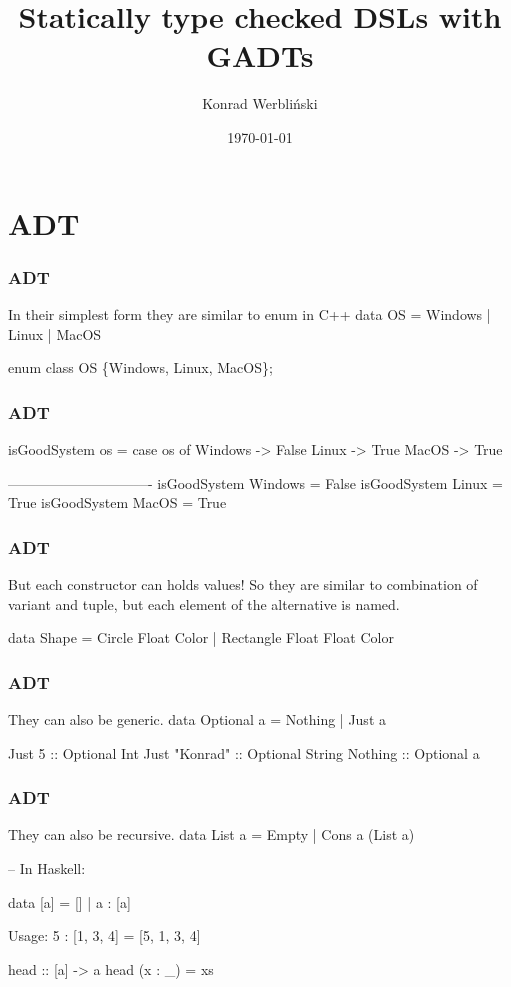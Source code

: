 \documentclass{beamer}
\title[GADT]{Statically type checked DSLs with GADTs} %
\author{Konrad Werbliński} %
\institute[UWr] %
\date{\today} %
\newenvironment{VerbExample}
{\example\semiverbatim}
{\endsemiverbatim\endexample}
\begin{document}
\begin{frame}
\titlepage %
\end{frame}

\section{ADT}

\begin{frame}[fragile]
  \frametitle{ADT}
  In their simplest form they are similar to enum in C++
  \begin{VerbExample}
data OS = Windows | Linux | MacOS

enum class OS \{Windows, Linux, MacOS\};
  \end{VerbExample}
\end{frame}


\begin{frame}[fragile]
  \frametitle{ADT}
  \begin{VerbExample}
isGoodSystem os = case os of
  Windows -> False
  Linux -> True
  MacOS -> True

-------------------------------
isGoodSystem Windows = False
isGoodSystem Linux = True
isGoodSystem MacOS = True
  \end{VerbExample}
\end{frame}


\begin{frame}[fragile]
  \frametitle{ADT}
  But each constructor can holds values! So they are similar to combination
  of variant and tuple, but each element of the alternative is named.
  \begin{VerbExample}

data Shape
  = Circle Float Color
  | Rectangle Float Float Color

  \end{VerbExample}
\end{frame}

\begin{frame}[fragile]
  \frametitle{ADT}
  They can also be generic.
  \begin{VerbExample}
data Optional a = Nothing | Just a

Just 5 :: Optional Int
Just "Konrad" :: Optional String
Nothing :: Optional a
  \end{VerbExample}
\end{frame}

\begin{frame}[fragile]
  \frametitle{ADT}
  They can also be recursive.
  \begin{VerbExample}
data List a = Empty | Cons a (List a)

-- In Haskell:

data [a] = [] | a : [a]

Usage:
5 : [1, 3, 4] = [5, 1, 3, 4]

head :: [a] -> a
head (x : _) = xs
  \end{VerbExample}
\end{frame}
\end{document}
